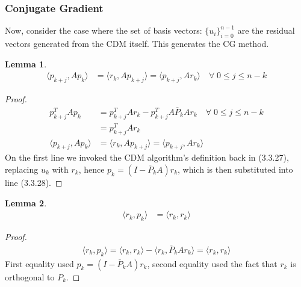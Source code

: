 \documentclass[]{article}
\theoremstyle{definition}
\newtheorem{lemma}{Lemma}[subsection]    %
\begin{document}
        \subsubsection{Conjugate Gradient}
            Now, consider the case where the set of basis vectors: $\{u_i \}_{i = 0}^{n - 1}$ are the residual vectors generated from the CDM itself. This generates the CG method.
            \begin{lemma}\label{lemma:CG_Lemma_1}
                \begin{align}
                    \langle p_{k + j}, Ap_k\rangle
                    &=\langle r_k, Ap_{k + j}\rangle
                    = \langle p_{k + j}, Ar_k\rangle \quad \forall\; 0 \le j \le n - k
                \end{align}
            \end{lemma}
            \begin{proof}
                \begin{align}
                    p_{k + j}^T Ap_k &= p_{k + j}^TAr_k - p_{k + j}^TA\overline{P}_{k}Ar_k \quad 
                    \forall\; 0 \le j \le n - k
                    \\
                    &= p_{k + j}^TAr_k
                    \\
                    \langle p_{k + j}, Ap_k\rangle
                    &= \langle r_k, Ap_{k + j}\rangle
                    = \langle p_{k + j}, Ar_k\rangle
                \end{align}
                On the first line we invoked the CDM algorithm's definition back in (3.3.27), replacing $u_k$ with $r_k$, hence $p_k = (I - \overline{P}_kA)r_k$, which is then substituted into line (3.3.28). 
            \end{proof}
            \begin{lemma}\label{lemma:CG_Lemma_2}
                \begin{align}
                    \langle r_k, p_k\rangle &= \langle r_k, r_k\rangle
                \end{align}
            \end{lemma}
            \begin{proof}
                \begin{align}
                    \langle r_k, p_k\rangle = \langle r_k, r_k\rangle - \langle r_k, \overline{P}_kAr_k\rangle = \langle r_k, r_k\rangle
                \end{align}
                First equality used $p_k = (I - \overline{P}_kA)r_k$, second equality used the fact that $r_k$ is orthogonal to $P_k$. 
            \end{proof}
\end{document}
